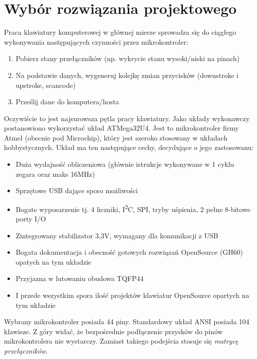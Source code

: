 \documentclass{article}
\begin{document}
    \section{Wybór rozwiązania projektowego}
    Praca klawiatury komputerowej w głównej mierze sprowadza się do ciągłego wykonywania następujących
    czynności przez mikrokontroler:
    \begin{enumerate}
        \item Pobierz stany przełączników (np. wykrycie stanu wysoki/niski na pinach)
        \item Na podstawie danych, wygeneruj kolejkę zmian przycisków (downstroke i upstroke, scancode)
        \item Prześlij dane do komputera/hosta
    \end{enumerate}
    Oczywiście to jest najsurowsza pętla pracy klawiatury. Jako układy wykonawczy postanowiono wykorzystać
    układ ATMega32U4. Jest to mikrokontroler firmy Atmel (obecnie pod Microchip), który jest szeroko stosowany
    w układach hobbystycznych. Układ ma ten następujące cechy, decydujące o jego zastosowanu:
    \begin{itemize}
        \item Duża wydajność obliczeniowa (głównie istrukcje wykonywane w 1 cyklu zegara oraz maks 16MHz)
        \item Sprzętowe USB dające sporo możliwości
        \item Bogate wyposarzenie tj. 4 liczniki,  I\textsuperscript{2}C, SPI, tryby uśpienia, 2 pełne 8-bitowe porty I/O
        \item Zintegrowany stabilizator 3,3V, wymagany dla komunikacji z USB
        \item Bogata dokumentacja i obecność gotowych rozwiązań OpenSource (GH60) opatych na tym układzie
        \item Przyjazna w lutowaniu obudowa TQFP44
        \item I przede wszystkim spora ilość projektów klawiatur OpenSource opartych na tym układzie
    \end{itemize}
    Wybrany mikrokontroler posiada 44 piny. Standardowy układ ANSI posiada 104 klawisze. Z góry widać, że bezpośrednie
    podłączenie przysków do pinów mikrokontrolera nie wystarczy. Zamiast takiego podejścia stosuje się \emph{matrycę przełączników}.
    \newpage
\end{document}

